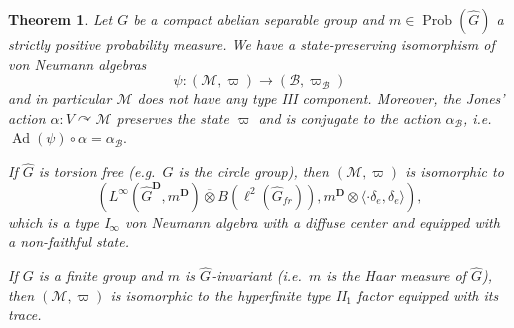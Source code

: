 \documentclass[a4paper,12pt]{amsart}
\numberwithin{equation}{section}
\newtheorem{theo}{Theorem}[section]
\theoremstyle{definition}
\newcommand{\act}{\curvearrowright}
\newcommand{\al}{\alpha}
\DeclareMathOperator{\Ad}{Ad}
\newcommand{\scrB}{\mathscr B}
\newcommand{\D}{\mathbf D}
\newcommand{\de}{\delta}
\newcommand{\scrM}{\mathscr M}
\newcommand{\ot}{\otimes}\newcommand{\otmin}{\otimes_{\text{min}}}
\newcommand{\ovt}{\overline\otimes}
\DeclareMathOperator{\Prob}{Prob}
\newcommand{\wh}{\widehat}
\begin{document}
\begin{theo}\label{theo:singlemes}
Let $G$ be a compact abelian separable group and $m\in\Prob(\wh G)$ a strictly positive probability measure.
We have a state-preserving isomorphism of von Neumann algebras 
$$\psi:(\scrM,\varpi)\to (\mathscr B,\varpi_\mathscr B)$$ and in particular $\scrM$ does not have any type III component.
Moreover, the Jones' action $\al:V\act \scrM$ preserves the state $\varpi$ and is conjugate to the action $\alpha_\scrB$, i.e.~$\Ad(\psi)\circ\alpha=\alpha_\scrB.$

If $\wh G$ is torsion free (e.g.~$G$ is the circle group), then $(\scrM,\varpi)$ is isomorphic to $$(L^\infty({\wh G}^\D, m^\D)\ovt B(\ell^2(\wh G_{fr})),m^\D\ot \langle \cdot \de_e,\de_e\rangle),$$
which is a type I$_\infty$ von Neumann algebra with a diffuse center and equipped with a non-faithful state.

If $G$ is a finite group and $m$ is $\wh G$-invariant (i.e.~$m$ is the Haar measure of $\wh G$), then $(\scrM,\varpi)$ is isomorphic to the hyperfinite type II$_1$ factor equipped with its trace.
\end{theo}
\end{document}
